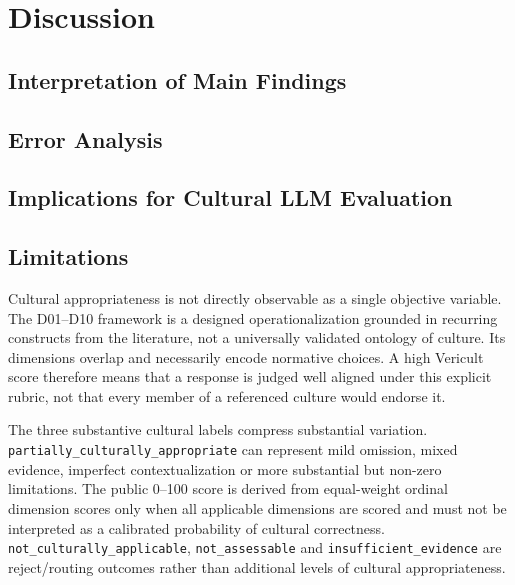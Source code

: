 \chapter{Discussion}
\label{ch:discussion}

\section{Interpretation of Main Findings}


\section{Error Analysis}












\section{Implications for Cultural LLM Evaluation}








\section{Limitations}
Cultural appropriateness is not directly observable as a single objective variable. The D01--D10 framework is a designed operationalization grounded in recurring constructs from the literature, not a universally validated ontology of culture. Its dimensions overlap and necessarily encode normative choices. A high Vericult score therefore means that a response is judged well aligned under this explicit rubric, not that every member of a referenced culture would endorse it.

The three substantive cultural labels compress substantial variation. \texttt{partially\_culturally\_appropriate} can represent mild omission, mixed evidence, imperfect contextualization or more substantial but non-zero limitations. The public 0--100 score is derived from equal-weight ordinal dimension scores only when all applicable dimensions are scored and must not be interpreted as a calibrated probability of cultural correctness. \texttt{not\_culturally\_applicable}, \texttt{not\_assessable} and \texttt{insufficient\_evidence} are reject/routing outcomes rather than additional levels of cultural appropriateness.

